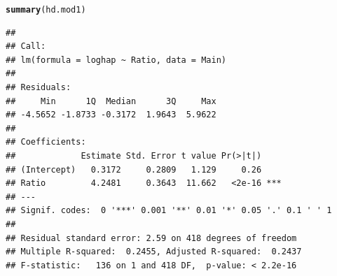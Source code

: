 \documentclass[12pt]{article}\usepackage[]{graphicx}\usepackage[]{color}
\makeatletter
\newcommand{\hlstd}[1]{\textcolor[rgb]{0.345,0.345,0.345}{#1}}%
\newcommand{\hlkwd}[1]{\textcolor[rgb]{0.737,0.353,0.396}{\textbf{#1}}}%
\newenvironment{kframe}{%
 \def\at@end@of@kframe{}%
 \ifinner\ifhmode%
  \def\at@end@of@kframe{\end{minipage}}%
  \begin{minipage}{\columnwidth}%
 \fi\fi%
 \def\FrameCommand##1{\hskip\@totalleftmargin \hskip-\fboxsep
 \colorbox{shadecolor}{##1}\hskip-\fboxsep
     \hskip-\linewidth \hskip-\@totalleftmargin \hskip\columnwidth}%
 \MakeFramed {\advance\hsize-\width
   \@totalleftmargin\z@ \linewidth\hsize
   \@setminipage}}%
 {\par\unskip\endMakeFramed%
 \at@end@of@kframe}
\newenvironment{knitrout}{}{} %
\makeatother
\begin{document}
\begin{knitrout}
\begin{kframe}\begin{alltt}
\hlkwd{summary}\hlstd{(hd.mod1)}
\end{alltt}
\begin{verbatim}
## 
## Call:
## lm(formula = loghap ~ Ratio, data = Main)
## 
## Residuals:
##     Min      1Q  Median      3Q     Max 
## -4.5652 -1.8733 -0.3172  1.9643  5.9622 
## 
## Coefficients:
##             Estimate Std. Error t value Pr(>|t|)    
## (Intercept)   0.3172     0.2809   1.129     0.26    
## Ratio         4.2481     0.3643  11.662   <2e-16 ***
## ---
## Signif. codes:  0 '***' 0.001 '**' 0.01 '*' 0.05 '.' 0.1 ' ' 1
## 
## Residual standard error: 2.59 on 418 degrees of freedom
## Multiple R-squared:  0.2455,	Adjusted R-squared:  0.2437 
## F-statistic:   136 on 1 and 418 DF,  p-value: < 2.2e-16
\end{verbatim}
\end{kframe}
\end{knitrout}
\end{document}
